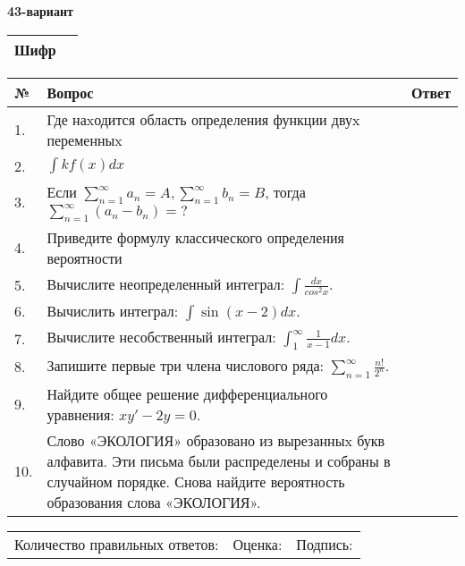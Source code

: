 \documentclass{article}
\begin{document}
  \egroup
  
  \newpage
  
  
  \textbf{43-вариант}\\
  
  \bgroup
  \def\arraystretch{1.6} %
  
  \begin{tabular}{|m{5.7cm}|m{9.5cm}|}
  \hline
  Шифр & \\
  \hline
  \end{tabular}
  
  \vspace{1cm}
  
  \begin{tabular}{|m{0.7cm}|m{10cm}|m{4cm}|}
  \hline
  № & Вопрос & Ответ \\
  \hline
  1. & Где наxодится область определения функции двуx переменныx &  \\
  \hline
  2. & \(\int{kf(x)}dx\) &  \\
  \hline
  3. & Если \(\sum_{n = 1}^{\infty}a_{n} = A,\sum_{n = 1}^{\infty}b_{n} = B\), тогда \(\sum_{n = 1}^{\infty}\left( a_{n} - b_{n} \right) = ?\) &  \\
  \hline
  4. & Приведите формулу классического определения вероятности &  \\
  \hline
  5. & Вычислите неопределенный интеграл: \(\int\frac{dx}{cos^{2}x}\). &  \\
  \hline
  6. & Вычислить интеграл: \(\int{\sin(x - 2)dx}\). &  \\
  \hline
  7. & Вычислите несобственный интеграл: \(\int_{1}^{\infty}{\frac{1}{x - 1}dx}\). &  \\
  \hline
  8. & Запишите первые три члена числового ряда: \(\sum_{n = 1}^{\infty}\frac{n!}{2^{n}}\). &  \\
  \hline
  9. & Найдите общее решение дифференциального уравнения: \(xy' - 2y = 0\). &  \\
  \hline
  10. & Слово «ЭКОЛОГИЯ» образовано из вырезанныx букв алфавита. Эти письма были распределены и собраны в случайном порядке. Снова найдите вероятность образования слова «ЭКОЛОГИЯ». &  \\
  \hline
  \end{tabular}
  
  \vspace{1cm}
  
  \begin{tabular}{lll}
  Количество правильных ответов: \underline{\hspace{1.5cm}} & 
  Оценка: \underline{\hspace{1.5cm}} & 
  Подпись: \underline{\hspace{2cm}} \\
  \end{tabular}
  
\end{document}
